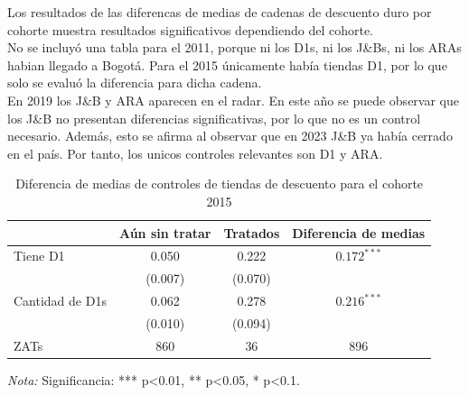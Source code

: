\documentclass{article}
\begin{document}
Los resultados de las diferencas de medias de cadenas de descuento duro por cohorte muestra resultados significativos dependiendo del cohorte.\\

No se incluyó una tabla para el 2011, porque ni los D1s, ni los J\&Bs, ni los ARAs habian llegado a Bogotá. Para el 2015 únicamente había tiendas D1, por lo que solo se evaluó la diferencia para dicha cadena. \\

En 2019 los J\&B y ARA aparecen en el radar. En este año se puede observar que los J\&B no presentan diferencias significativas, por lo que no es un control necesario. Además, esto se afirma al observar que en 2023 J\&B ya había cerrado en el país. Por tanto, los unicos controles relevantes son D1 y ARA.\\

\begin{table} [H]
  \centering
  \caption{Diferencia de medias de controles de tiendas de descuento para el cohorte 2015}
  \label{tab:d1}
  \begin{tabular}{l c c c}
    \toprule
    & \textbf{Aún sin tratar} & \textbf{Tratados} & \textbf{Diferencia de medias} \\
    \midrule
    Tiene D1 & 0.050 & 0.222 & $0.172^{***}$ \\
    & (0.007) & (0.070) & \\
    \midrule
    Cantidad de D1s & 0.062 & 0.278 & $0.216^{***}$ \\
    & (0.010) & (0.094) & \\
    \midrule
    ZATs & 860 & 36 & 896 \\
    \bottomrule
  \end{tabular}
  \parbox[t]{\textwidth}{%
    \vspace{0.5em}
    \footnotesize{ \textit{Nota:} Significancia: *** p<0.01, ** p<0.05, * p<0.1.}}
\end{table}
\end{document}
